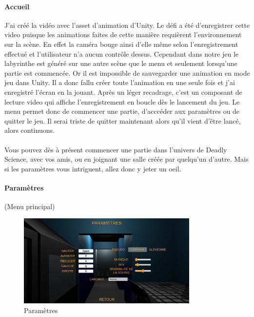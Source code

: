 \documentclass{article}
\begin{document}
\paragraph{Accueil}
J'ai créé la vidéo avec l'asset d'animation d'Unity. Le défi a été d'enregistrer cette video puisque les animations faites de cette manière requièrent l'environnement sur la scène. En effet la caméra bouge ainsi d'elle même selon l'enregistrement effectué et l'utilisateur n'a aucun contrôle dessus. Cependant dans notre jeu le labyrinthe est généré sur une autre scène que le menu et seulement lorsqu'une partie est commencée. Or il est impossible de sauvegarder une animation en mode jeu dans Unity. Il a donc fallu créer toute l'animation en une seule fois et j'ai enregistré l'écran en la jouant. Après un léger recadrage, c'est un composant de lecture video qui affiche l'enregistrement en boucle dès le lancement du jeu.
\newline
Le menu permet donc de commencer une partie, d'acccéder aux paramètres ou de quitter le jeu. Il serai triste de quitter maintenant alors qu'il vient d'être lancé, alors continuons.

\paragraph{}
Vous pouvez dès à présent commencer une partie dans l'univers de Deadly Science, avec vos amis, ou en joignant une salle créée par quelqu'un d'autre. Mais si les paramètres vous intriguent, allez donc y jeter un oeil.

\paragraph{Paramètres}
(Menu principal)

\begin{figure}[H]
	\centering
	\includegraphics[width=0.8\textwidth]{Parametres.png}
	\caption{Paramètres}
	\label{Paramètres}
\end{figure}
\end{document}
